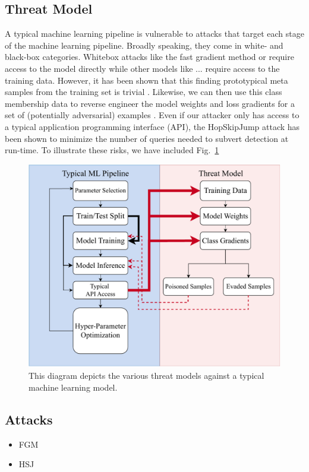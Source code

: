 \documentclass[sigconf]{acmart}
\begin{document}
\subsection{Threat Model}
A typical machine learning pipeline is vulnerable to attacks that target each stage of the machine learning pipeline. Broadly speaking, they come in white- and black-box categories. Whitebox attacks like the fast gradient method \cite{fgm} or \cite{deepfool} require access to the model directly while other models like ... \cite{} require access to the training data. However, it has been shown that this finding prototypical meta samples from the training set is trivial \cite{}. Likewise, we can then use this class membership data to reverse engineer the model weights \cite{} and loss gradients for a set of (potentially adversarial) examples \cite{}. Even if our attacker only has access to a typical application programming interface (API), the HopSkipJump attack \cite{hopskipjump} has been shown to minimize the number of queries needed to subvert detection at run-time. To illustrate these risks, we have included Fig.~\ref{fig:threat_model}
\begin{figure}[h!]
    \centering
    \includegraphics[width=.8\textwidth]{images/attack_diagram.pdf}
    \caption{This diagram depicts the various threat models against a typical machine learning model.}
    \label{fig:threat_model}
\end{figure}
\label{threat}

\subsection{Attacks}
\label{attacks}
\begin{itemize}
    \item FGM
    \item HSJ


\end{itemize}
\end{document}
